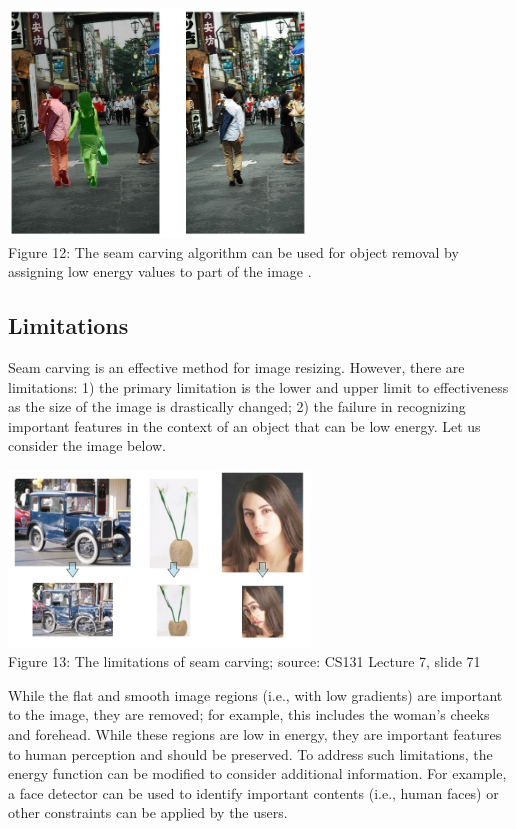 \documentclass{article}
\begin{document}
\begin{center}
\includegraphics[width=8cm]{object_removal.JPG} \\
Figure 12: The seam carving algorithm can be used for object removal by assigning low energy values to part of the image \cite{siggraphseamcarving}.
\end{center}

\subsection{Limitations}
Seam carving is an effective method for image resizing. However, there are limitations: 1) the primary limitation is the lower and upper limit to effectiveness as the size of the image is drastically changed; 2) the failure in recognizing important features in the context of an object that can be low energy. Let us consider the image below.
\begin{center}
\includegraphics[width=8cm]{seam_carving_limitations.JPG} \\
Figure 13: The limitations of seam carving; source: CS131 Lecture 7, slide 71
\end{center}

While the flat and smooth image regions (i.e., with low gradients) are important to the image, they are removed; for example, this includes the woman's cheeks and forehead. While these regions are low in energy, they are important features to human perception and should be preserved. To address such limitations, the energy function can be modified to consider additional information. For example, a face detector can be used to identify important contents (i.e., human faces) or other constraints can be applied by the users.
\end{document}
